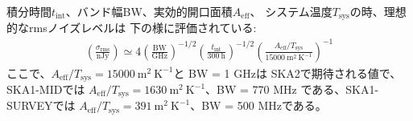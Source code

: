 積分時間$t_\mathrm{int}$、バンド幅BW、実効的開口面積$A_\mathrm{eff}$、
システム温度$T_\mathrm{sys}$の時、理想的なrmsノイズレベルは
下の様に評価されている\citep{2009ApJ...706..482M}:
\begin{eqnarray}
\left(\frac{\sigma_\mathrm{rms}}{\mathrm{nJy}}\right)\simeq 4
\left(\frac{\mathrm{BW}}{\mathrm{GHz}}\right)^{-1/2}
\left(\frac{t_\mathrm{int}}{300~\mathrm{h}}\right)^{-1/2}
\left(\frac{A_\mathrm{eff}/T_\mathrm{sys}}{15000~\mathrm{m^2~K^{-1}}}\right)^{-1}
\label{eq:detection_limit}
\end{eqnarray}
ここで、$A_\mathrm{eff}/T_\mathrm{sys}=15000~\mathrm{m^2~K^{-1}}$と
BW = 1 GHzは
SKA2で期待される値で、SKA1-MIDでは
$A_\mathrm{eff}/T_\mathrm{sys}=1630~\mathrm{m^2~K^{-1}}$、BW = 770 MHz
である、SKA1-SURVEYでは
$A_\mathrm{eff}/T_\mathrm{sys}=391~\mathrm{m^2~K^{-1}}$、BW = 500 MHzである。
